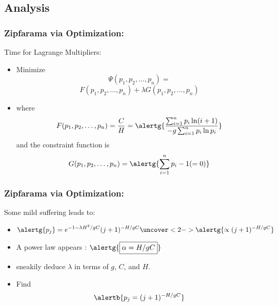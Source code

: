 \subsection{Analysis}

\begin{frame}
  \frametitle{Zipfarama via Optimization:}

  \begin{block}{Time for Lagrange Multipliers:}
    \begin{itemize}
    \item<1->
      Minimize
      $$
      \Psi(p_1,p_2,\ldots,p_n) = 
      $$
      $$
      F(p_1,p_2,\ldots,p_n) + \lambda G(p_1,p_2,\ldots,p_n)
      $$
    \item<2->[]
      where
      $$
      F(p_1,p_2,\ldots,p_n)
      = 
      \frac{C}{H}
      =
      \alertg{
        \frac{\sum_{i=1}^n p_i \ln (i+1)}
        {-g\sum_{i=1}^n p_i \ln p_i}
      }
      $$
      and the
      constraint function is
      $$
      G(p_1,p_2,\ldots,p_n) = \alertg{\sum_{i=1}^n p_i - 1  (= 0)}
      $$
    \end{itemize}
  \end{block}
  
\end{frame}

\begin{frame}
  \frametitle{Zipfarama via Optimization:}

  \begin{block}{Some mild suffering leads to:}
    \begin{itemize}
    \item<1->
      $$
      \alertg{p_j} = e^{-1 -\lambda H^2/gC} (j+1)^{-H/gC} \uncover<2->{\alertg{\propto (j+1)^{-H/gC}}}
      $$
    \item<3-> A power law appears \alertg{[applause]}: $\alertg{\boxed{\alpha = H/gC}}$
    \item<4->  sneakily deduce $\lambda$ in terms of $g$, $C$, and $H$.
    \item<5-> Find
      $$
      \alertb{p_j = (j+1)^{-H/gC}}
      $$
    \end{itemize}
  \end{block}

  
\end{frame}

